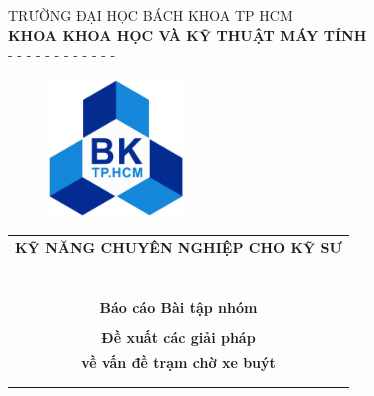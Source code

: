 \begin{titlepage}
\vspace{0cm}
\begin{center} \large
TRƯỜNG ĐẠI HỌC BÁCH KHOA TP HCM \\
\textbf{KHOA KHOA HỌC VÀ KỸ THUẬT MÁY TÍNH } \\
- - - - - - - - - - - -
\end{center}


\vspace{1cm}
\begin{figure}[h!]
\begin{center}
\includegraphics[width=3.6cm]{Images/LogoBK}
\end{center}
\end{figure}
\vspace{1cm}



\begin{center}
\begin{tabular}{c}
\multicolumn{1}{c}{\textbf{{\huge KỸ NĂNG CHUYÊN NGHIỆP CHO KỸ SƯ}}}\\
~~\\
\hline
\\ \\
\multicolumn{1}{c}{\textbf{{\Large Báo cáo Bài tập nhóm}}}\\
\\
\textbf{{\Huge Đề xuất các giải pháp}} \\
\textbf{{\Huge về vấn đề trạm chờ xe buýt}} \\
\\ \\
\hline
\end{tabular}
\end{center}


\end{titlepage}
